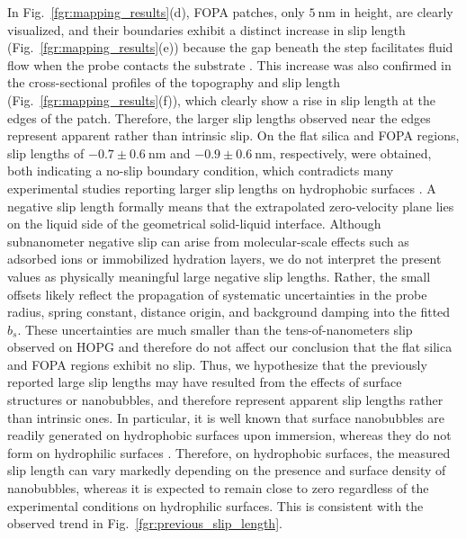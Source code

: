 \documentclass[journal=jacsat,manuscript=article]{achemso}
\providecommand{\DIFadd}[1]{{\protect\color{blue}#1}} %
\providecommand{\DIFaddbegin}{} %
\providecommand{\DIFaddend}{} %
\newcommand{\DIFaddincludegraphics}[2][]{{\color{blue}\DIFOincludegraphics[#1]{#2}}} %
\DeclareRobustCommand{\DIFaddbegin}{\DIFOaddbegin \let\includegraphics\DIFaddincludegraphics} %
\DeclareRobustCommand{\DIFaddend}{\DIFOaddend \let\includegraphics\DIFOincludegraphics} %
\begin{document}
In Fig.~\ref{fgr:mapping_results}(d), FOPA patches, only \(\SI{5}{\nano\metre}\) in height, are clearly visualized, and their boundaries exhibit a distinct increase in slip length (Fig.~\ref{fgr:mapping_results}(e)) because the gap beneath the step facilitates fluid flow when the probe contacts the substrate \cite{Ybert2007-jv}. This increase was also confirmed in the cross-sectional profiles of the topography and slip length (Fig.~\ref{fgr:mapping_results}(f)), which clearly show a rise in slip length at the edges of the patch. Therefore, the larger slip lengths observed near the edges represent apparent rather than intrinsic slip. On the flat silica and FOPA regions, slip lengths of \(-0.7 \pm \SI{0.6}{\nano\metre}\) and \(-0.9 \pm \SI{0.6}{\nano\metre}\), respectively, were obtained, both indicating a no-slip boundary condition, which contradicts many experimental studies reporting larger slip lengths on hydrophobic surfaces \cite{Tretheway2002-et, Cho2004-it, Bouzigues2008-xn, Cottin-Bizonne2008-nc, Lasne2008-qt, Bhushan2009-yz, Jing2013-kn, Zhang2021-tn, Li2022-qs, Han2025-qq}. \DIFaddbegin \DIFadd{A negative slip length formally means that the extrapolated zero-velocity plane lies on the liquid side of the geometrical solid-liquid interface. Although subnanometer negative slip can arise from molecular-scale effects such as adsorbed ions or immobilized hydration layers, we do not interpret the present values as physically meaningful large negative slip lengths. Rather, the small offsets likely reflect the propagation of systematic uncertainties in the probe radius, spring constant, distance origin, and background damping into the fitted \(b_s\). These uncertainties are much smaller than the tens-of-nanometers slip observed on HOPG and therefore do not affect our conclusion that the flat silica and FOPA regions exhibit no slip. }\DIFaddend Thus, we hypothesize that the previously reported large slip lengths may have resulted from the effects of surface structures or nanobubbles, and therefore represent apparent slip lengths rather than intrinsic ones. In particular, it is well known that surface nanobubbles are readily generated on hydrophobic surfaces upon immersion, whereas they do not form on hydrophilic surfaces \cite{Yang2003-mh, Agrawal2005-oo}. Therefore, on hydrophobic surfaces, the measured slip length can vary markedly depending on the presence and surface density of nanobubbles, whereas it is expected to remain close to zero regardless of the experimental conditions on hydrophilic surfaces. This is consistent with the observed trend in Fig.~\ref{fgr:previous_slip_length}.
\end{document}
